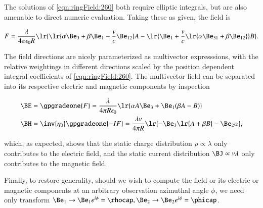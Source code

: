 The solutions of \cref{eqn:ringField:260} both require elliptic integrals, but are also amenable to direct numeric evaluation.
Taking these as given, the field is

\begin{dmath}\label{eqn:ringField:220}
F
=
\frac{\lambda}{4 \pi \epsilon_0 R}
\lr{
\lr{ \alpha \Be_3 + \beta \Be_1 -\frac{v }{c}\Be_{12} } A
- \lr{
\Be_1 + \frac{v}{c} \lr{ \alpha \Be_{31} + \beta \Be_{12} } } B
}.
\end{dmath}

The field directions are nicely parameterized as multivector expresssions, with the relative weightings in different directions scaled by the position dependent integral coefficients of \cref{eqn:ringField:260}.
The multivector field can be separated into its respective electric and magnetic components by inspection

\begin{dmath}\label{eqn:ringField:240}
\begin{aligned}
\BE &=
\gpgradeone{F}
=
\frac{\lambda}{4 \pi R \epsilon_0} \lr{ \alpha A \Be_3 + \Be_1( \beta A - B) } \\
\BH &=
\inv{\eta_0} \gpgradeone{-I F}
=
\frac{\lambda v}{4 \pi R } \lr{ -\Be_3 \lr{ A + \beta B } - \Be_2 \alpha },
\end{aligned}
\end{dmath}

which, as expected, shows that the static charge distribution \( \rho \propto \lambda \) only contributes to the electric field, and the static current distribution \( \BJ \propto v \lambda \) only contributes to the magnetic field.

Finally, to restore generality,
should we wish to compute the field or its electric or magnetic components at an arbitrary observation azimuthal angle \( \phi \), we need only transform \( \Be_1 \rightarrow \Be_1 e^{i \phi} = \rhocap, \Be_2 \rightarrow \Be_2 e^{i\phi} = \phicap \).


